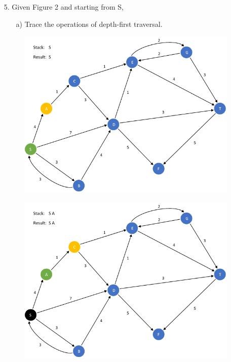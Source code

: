 \documentclass{article}
\begin{document}
\begin{enumerate}[leftmargin=\labelsep]
  \item[5.] Given Figure 2 and starting from S,
  \begin{enumerate}[leftmargin=\labelsep]
    \item[a)] Trace the operations of depth-first traversal.
  \end{enumerate}

\begin{figure}[H]
\centering
\includegraphics[scale=0.6]{images/Q5/a/01.png}
\end{figure}

\begin{figure}[H]
\centering
\includegraphics[scale=0.6]{images/Q5/a/02.png}
\end{figure}


\end{enumerate}
\end{document}
